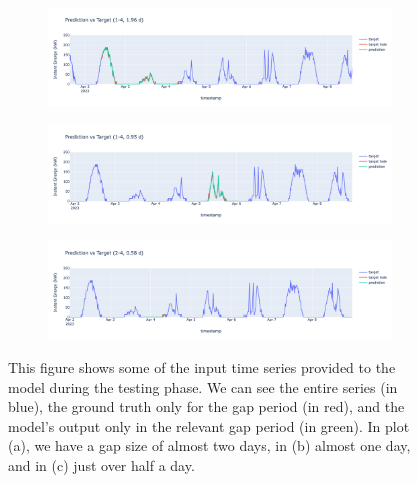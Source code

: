 \begin{figure}[H]
	\centering
	\begin{subfigure}{\textwidth}
		\centering
		\includegraphics[width=\textwidth]{chapters/3_models/imgs/gab/eval/gabplotall1.png}
		\caption{}
	\end{subfigure}
	\begin{subfigure}{\textwidth}
		\centering
		\includegraphics[width=\textwidth]{chapters/3_models/imgs/gab/eval/gabplotall2.png}
		\caption{}
	\end{subfigure}
	\begin{subfigure}{\textwidth}
		\centering
		\includegraphics[width=\textwidth]{chapters/3_models/imgs/gab/eval/gabplotall3.png}
		\caption{}
	\end{subfigure}
	\caption{This figure shows some of the input time series provided to the model during the testing phase. We can see the entire series (in blue), the ground truth only for the gap period (in red), and the model's output only in the relevant gap period (in green). In plot (a), we have a gap size of almost two days, in (b) almost one day, and in (c) just over half a day.}
	\label{fig:gaballplotsgaps}
\end{figure}


